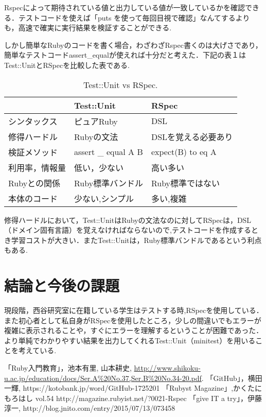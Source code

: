 \documentclass[a4j,twocolumn,uplatex]{jarticle}
\begin{document}
Rspecによって期待されている値と出力している値が一致しているかを確認できる．テストコードを使えば「puts を使って毎回目視で確認」なんてするよりも，高速で確実に実行結果を検証することができる.

しかし簡単なRubyのコードを書く場合，わざわざRspec書くのは大げさであり，簡単なテストコードassert\_equalが使えれば十分だと考えた．下記の表１はTest::UnitとRSpecを比較した表である.

\begin{table}[htb]
  \begin{center}
   \caption{Test::Unit vs RSpec.}
   \begin{tabular}{|l||l|l|} \hline
        & Test::Unit  &  RSpec  \\
    \hline \hline
    シンタックス  & ピュアRuby  & DSL \\
    修得ハードル  & Rubyの文法   &  DSLを覚える必要あり\\
    検証メソッド  & assert \_ equal A B  &  expect(B) to eq A \\
    利用率，情報量&低い，少ない&高い多い\\
    Rubyとの関係 & Ruby標準バンドル& Ruby標準ではない\\
    本体のコード&少ない,シンプル&多い,複雑\\
    \hline
  \end{tabular}
  \end{center}
\end{table}

修得ハードルにおいて，Test::UnitはRubyの文法なのに対してRSpecは，DSL（ドメイン固有言語）を覚えなければならないので,テストコードを作成するとき学習コストが大きい．またTest::Unitは，Ruby標準バンドルであるという利点もある\cite{4}.
\section{結論と今後の課題}
現段階，西谷研究室に在籍している学生はテストする時,RSpecを使用している．
また初心者として私自身がRSpecを使用したところ，少しの間違いでもエラーが複雑に表示されることや，すぐにエラーを理解するということが困難であった．より単純でわかりやすい結果を出力してくれるTest::Unit（minitest）を用いることを考えている.

\begin{flushleft}
\begin{thebibliography}{9}
「Ruby入門教育」，池本有里, 山本耕史, \url{http://www.shikoku-u.ac.jp/education/docs/Ser.A%20No.37,Ser.B%20No.34-20.pdf}.
 「GitHub」，横田一輝, https://kotobank.jp/word/GitHub-1725201
 「Rubyst Magazine」,かくたに もろはし vol.54 http://magazine.rubyist.net/?0021-Rspec
 「give IT a try」，伊藤淳一, http://blog.jnito.com/entry/2015/07/13/073458
\end{thebibliography}
\end{flushleft}
\end{document}
